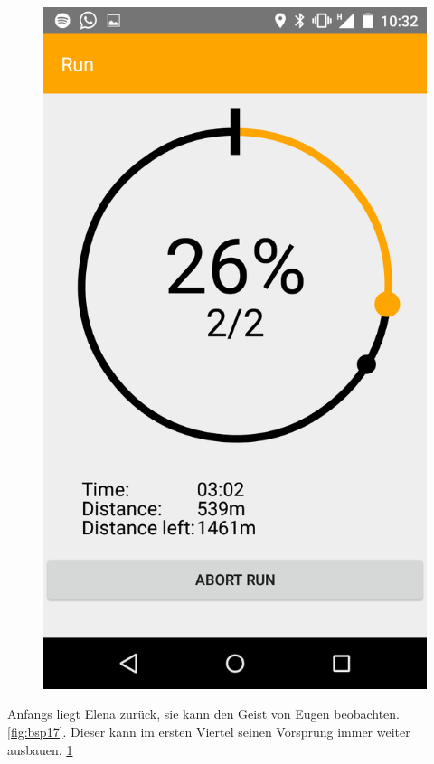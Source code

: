 \begin{figure}
\begin{minipage}{.4\textwidth}
  \includegraphics[width=.8\linewidth]{abb/bsp/bsp18}
  \label{fig:bsp18}
\end{minipage}
\end{figure}

Anfangs liegt Elena zurück, sie kann den Geist von Eugen beobachten. \ref{fig:bsp17}. Dieser kann im ersten Viertel seinen Vorsprung immer weiter ausbauen. \ref{fig:bsp18}

